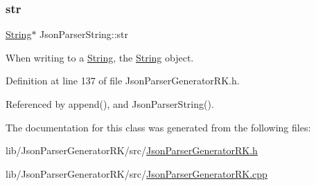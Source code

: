 \mbox{\label{class_json_parser_string_ac98659ff5a56537979b6c60d28648224}} 
\subsubsection{\texorpdfstring{str}{str}}
{\footnotesize\ttfamily \hyperlink{class_string}{String}$\ast$ Json\+Parser\+String\+::str\hspace{0.3cm}{\ttfamily [protected]}}



When writing to a \hyperlink{class_string}{String}, the \hyperlink{class_string}{String} object. 



Definition at line 137 of file Json\+Parser\+Generator\+R\+K.\+h.



Referenced by append(), and Json\+Parser\+String().



The documentation for this class was generated from the following files\+:\begin{DoxyCompactItemize}
\item 
lib/\+Json\+Parser\+Generator\+R\+K/src/\hyperlink{_json_parser_generator_r_k_8h}{Json\+Parser\+Generator\+R\+K.\+h}\item 
lib/\+Json\+Parser\+Generator\+R\+K/src/\hyperlink{_json_parser_generator_r_k_8cpp}{Json\+Parser\+Generator\+R\+K.\+cpp}\end{DoxyCompactItemize}

